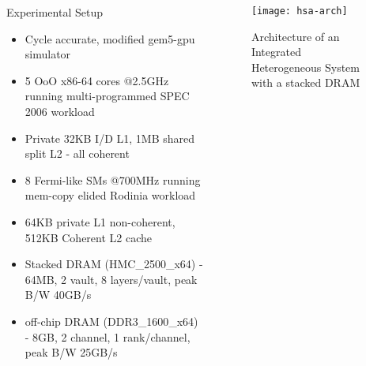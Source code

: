 \documentclass[final,t]{beamer}
\begin{document}
\begin{frame}[t,fragile]{}
\begin{columns}[t]
\begin{column}{.47\linewidth}
	\begin{exampleblock} {Experimental Setup}
	{
	\footnotesize
	\begin{itemize}
		\item Cycle accurate, modified gem5-gpu simulator
		\item 5 OoO x86-64 cores @2.5GHz running multi-programmed SPEC 2006 workload
		\item Private 32KB I/D L1, 1MB shared split L2 - all coherent
		\item 8 Fermi-like SMs @700MHz running mem-copy elided Rodinia workload
		\item 64KB private L1 non-coherent, 512KB Coherent L2 cache
		\item Stacked DRAM (HMC\_2500\_x64) - 64MB, 2 vault, 8 layers/vault, peak B/W 40GB/s
		\item off-chip DRAM (DDR3\_1600\_x64) - 8GB, 2 channel, 1 rank/channel, peak B/W 25GB/s
	\end{itemize}
	}
	\end{exampleblock}	
	
\end{column}


\begin{column}{.47\linewidth}

	\begin{figure}
		\centering
    	\texttt{[image: hsa-arch]} \\
    	\caption{Architecture of an Integrated Heterogeneous System with a stacked DRAM}
    \end{figure}


\end{column}
\end{columns}
\end{frame}
\end{document}
